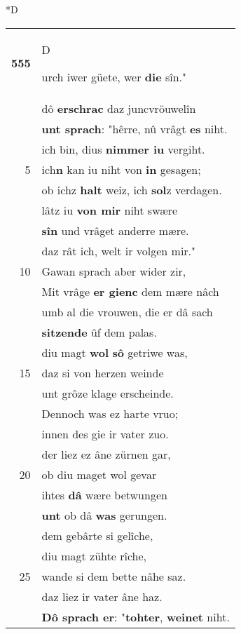 \documentclass[8pt,a4paper,notitlepage]{article}
\begin{document}
\begin{table}[ht]
\begin{minipage}[t]{0.5\linewidth}
\small
\begin{center}*D
\end{center}
\begin{tabular}{rl}
\textbf{555} & \begin{large}D\end{large}urch iwer güete, wer \textbf{die} sîn."\\ 
 & dô \textbf{erschrac} daz juncvröuwelîn\\ 
 & \textbf{unt sprach}: "hêrre, nû vrâgt \textbf{es} niht.\\ 
 & ich bin, dius \textbf{nimmer iu} vergiht.\\ 
5 & ich\textbf{n} kan iu niht von \textbf{in} gesagen;\\ 
 & ob ichz \textbf{halt} weiz, ich \textbf{sol}z verdagen.\\ 
 & lâtz iu \textbf{von mir} niht swære\\ 
 & \textbf{sîn} und vrâget anderre mære.\\ 
 & daz rât ich, welt ir volgen mir."\\ 
10 & Gawan sprach aber wider zir,\\ 
 & Mit vrâge \textbf{er gienc} dem mære nâch\\ 
 & umb al die vrouwen, die er dâ sach\\ 
 & \textbf{sitzende} ûf dem palas.\\ 
 & diu magt \textbf{wol} \textbf{sô} getriwe was,\\ 
15 & daz si von herzen weinde\\ 
 & unt grôze klage erscheinde.\\ 
 & Dennoch was ez harte vruo;\\ 
 & innen des gie ir vater zuo.\\ 
 & der liez ez âne zürnen gar,\\ 
20 & ob diu maget wol gevar\\ 
 & ihtes \textbf{dâ} wære betwungen\\ 
 & \textbf{unt} ob dâ \textbf{was} gerungen.\\ 
 & dem gebârte si gelîche,\\ 
 & diu magt zühte rîche,\\ 
25 & wande si dem bette nâhe saz.\\ 
 & daz liez ir vater âne haz.\\ 
 & \textbf{Dô sprach er}: "\textbf{tohter}, \textbf{weinet} niht.\\ 

\end{tabular}
\end{minipage}
\end{table}
\end{document}
